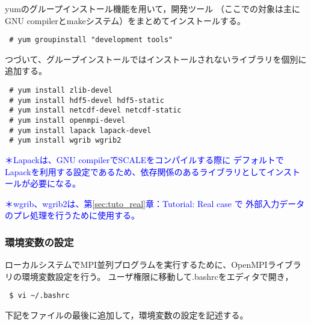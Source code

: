 
\noindent yumのグループインストール機能を用いて，開発ツール
（ここでの対象は主にGNU compilerとmakeシステム）をまとめてインストールする。
\begin{verbatim}
 # yum groupinstall "development tools"
\end{verbatim}

\noindent つづいて、グループインストールではインストールされないライブラリを個別に追加する。
\begin{verbatim}
 # yum install zlib-devel
 # yum install hdf5-devel hdf5-static
 # yum install netcdf-devel netcdf-static
 # yum install openmpi-devel
 # yum install lapack lapack-devel
 # yum install wgrib wgrib2
\end{verbatim}

\noindent \textcolor{blue}{\small ＊Lapackは、GNU compilerでSCALEをコンパイルする際に
デフォルトでLapackを利用する設定であるため、依存関係のあるライブラリとしてインストールが必要になる。}

\noindent \textcolor{blue}{\small ＊wgrib、wgrib2は、第\ref{sec:tuto_real}章：Tutorial: Real case で
外部入力データのプレ処理を行うために使用する。}



\subsubsection{環境変数の設定}

ローカルシステムでMPI並列プログラムを実行するために、OpenMPIライブラリの環境変数設定を行う。
ユーザ権限に移動して.bashrcをエディタで開き，
\begin{verbatim}
 $ vi ~/.bashrc
\end{verbatim}
下記をファイルの最後に追加して，環境変数の設定を記述する。\\

\\

